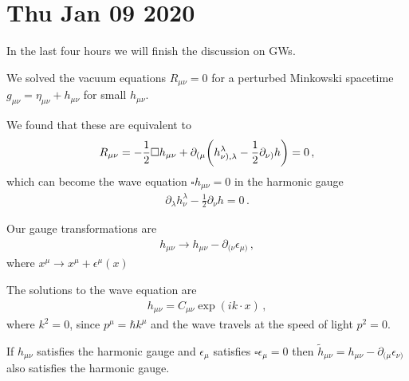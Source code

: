 \documentclass[main.tex]{subfiles}
\begin{document}
\section*{Thu Jan 09 2020}

In the last four hours we will finish the discussion on GWs. 

We solved the vacuum equations \(R_{\mu \nu }=0\) for a perturbed Minkowski spacetime \(g_{\mu \nu } = \eta_{\mu \nu } + h_{\mu \nu } \) for small \(h_{\mu \nu }\). 

We found that these are equivalent to 
%
\begin{align}
R_{\mu \nu }  = - \frac{1}{2} \square h_{\mu \nu } + \partial_{(\mu } \qty(h^{\lambda }_{\nu) , \lambda } - \frac{1}{2} \partial_{\nu) }h )  =0
\,,
\end{align}
%
which can become the wave equation \(\square h_{\mu \nu } = 0\) in the harmonic gauge 
%
\begin{align}
\partial_{\lambda } h^{\lambda }_{\nu } - \frac{1}{2} \partial_{\nu } h =0
\,.
\end{align}

Our gauge transformations are 
%
\begin{align}
h_{\mu \nu } \rightarrow h_{\mu \nu } - \partial_{(\nu  } \epsilon_{\mu )}
\,,
\end{align}
%
where \(x^{\mu } \rightarrow x^{\mu } + \epsilon^{\mu }(x)\)

The solutions to the wave equation are 
%
\begin{align}
h_{\mu \nu } = C_{\mu \nu } \exp(i k \cdot x)
\,,
\end{align}
%
where \(k^2=0\), since \(p^{\mu } = \hbar k^{\mu }\) and the wave travels at the speed of light \(p^2=0\). 

\begin{claim}
If \(h_{\mu \nu }\) satisfies the harmonic gauge and \(\epsilon_{\mu }\) satisfies \(\square \epsilon_{\mu } = 0\) then \(\widetilde{h}_{\mu \nu } =  h_{\mu \nu } - \partial_{(\mu } \epsilon_{\nu )}\) also satisfies the harmonic gauge. 
\end{claim}
\end{document}
